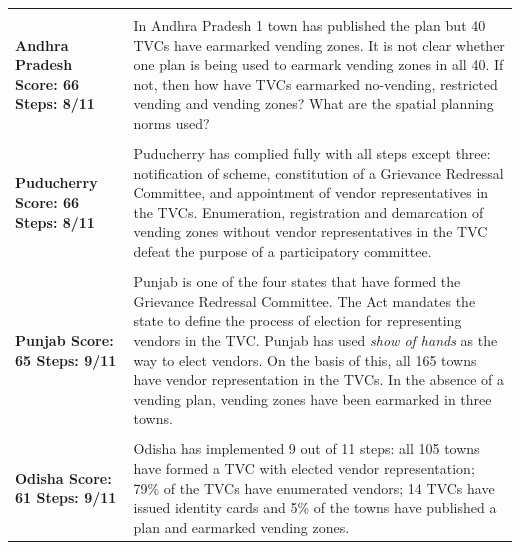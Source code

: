 \documentclass[a4paper, 12pt, twoside, table]{article}
\begin{document}
{\begin{longtable}[l]{>{\raggedright}p{4cm}>{\raggedright\arraybackslash}p{10cm}}
\cellcolor{SVACgreen3} & \cellcolor{SVACgreen2} \\

\cellcolor{SVACgreen3}\bf{Andhra Pradesh}
\newline
\bf{Score: 66}
\newline
\bf{Steps: 8/11} & \cellcolor{SVACgreen2}In Andhra Pradesh 1 town has published the plan but 40 TVCs have earmarked vending zones. It is not clear whether one plan is being used to earmark vending zones in all 40. If not, then how have TVCs earmarked no-vending, restricted vending and vending zones? What are the spatial planning norms used? \\

\cellcolor{SVACgreen3} & \cellcolor{SVACgreen2} \\

\cellcolor{SVACgreen3}\bf{Puducherry}
\newline
\bf{Score: 66}
\newline
\bf{Steps: 8/11} & \cellcolor{SVACgreen2}Puducherry has complied fully with all steps except three: notification of scheme, constitution of a Grievance Redressal Committee, and appointment of vendor representatives in the TVCs. Enumeration, registration and demarcation of vending zones without vendor representatives in the TVC defeat the purpose of a participatory committee.\\
\cellcolor{SVACgreen3} & \cellcolor{SVACgreen2} \\

\cellcolor{SVACgreen3}\bf{Punjab}
\newline
\bf{Score: 65}
\newline
\bf{Steps: 9/11} & \cellcolor{SVACgreen2}Punjab is one of the four states that have formed the Grievance Redressal Committee. The Act mandates the state to define the process of election for representing vendors in the TVC. Punjab has used \textit{show of hands} as the way to elect vendors. On the basis of  this, all 165 towns have vendor representation in the TVCs. In the absence of a vending plan, vending zones have been earmarked in three towns. \\

\cellcolor{SVACgreen3} & \cellcolor{SVACgreen2} \\

\cellcolor{SVACgreen3}\bf{Odisha}
\newline
\bf{Score: 61}
\newline
\bf{Steps: 9/11} & \cellcolor{SVACgreen2}Odisha has implemented 9 out of 11 steps: all 105 towns have formed a TVC with elected vendor representation; 79\% of the TVCs have enumerated vendors; 14 TVCs have issued identity cards and 5\% of the towns have published a plan and earmarked vending zones. \\


\end{longtable}}
\end{document}
